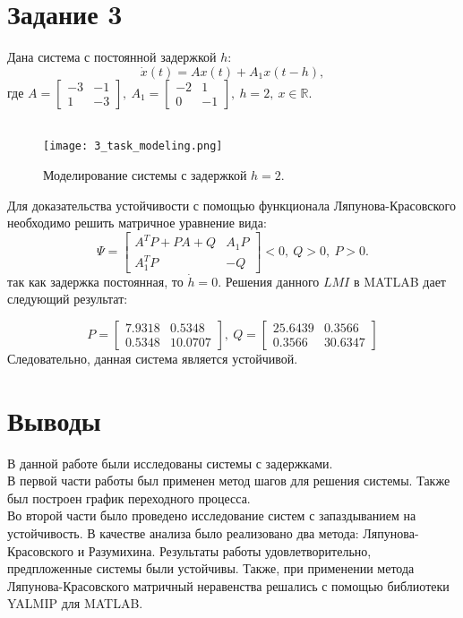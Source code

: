 \documentclass[12pt]{article}
\begin{document}
\section*{Задание 3}
Дана система с постоянной задержкой $h$:
\[
    \dot{x}(t) = Ax(t)+A_1x(t-h),
\]
где $A = \begin{bmatrix}
    -3 & -1 \\
    1 & -3
\end{bmatrix}, \ A_1 = \begin{bmatrix}
    -2 & 1 \\
    0 & -1
\end{bmatrix}, \ h = 2, \ x \in \mathbb{R}$.\\
\ \\

\begin{figure}[H]
    \centering
    \texttt{[image: 3\_task\_modeling.png]}
    \caption{Моделирование системы с задержкой $h=2$.}
    \label{fig:3_task_modeling}
\end{figure}

Для доказательства устойчивости с помощью функционала Ляпунова-Красовского необходимо решить матричное уравнение вида:
\[
    \Psi = \begin{bmatrix}
        A^TP + PA + Q & A_1P \\
        A_1^TP & -Q
    \end{bmatrix} < 0, \ Q > 0, \ P > 0.
\]
так как задержка постоянная, то $\dot{h} = 0$. Решения данного $LMI$ в MATLAB дает следующий результат:

\[
    P = \begin{bmatrix}
        7.9318 & 0.5348 \\
        0.5348 & 10.0707
    \end{bmatrix}, \ Q = \begin{bmatrix}
        25.6439 & 0.3566 \\
        0.3566 & 30.6347
    \end{bmatrix}
\]
Следовательно, данная система является устойчивой.

\section*{Выводы}
В данной работе были исследованы системы с задержками. \\
В первой части работы был применен метод шагов для решения системы. Также был построен график переходного процесса. \\
Во второй части было проведено исследование систем с запаздыванием на устойчивость. В качестве анализа было реализовано два метода: Ляпунова-Красовского и Разумихина. Результаты работы удовлетворительно, предпложенные системы были устойчивы. Также, при применении метода Ляпунова-Красовского матричный неравенства решались с помощью библиотеки YALMIP для MATLAB.
\end{document}
